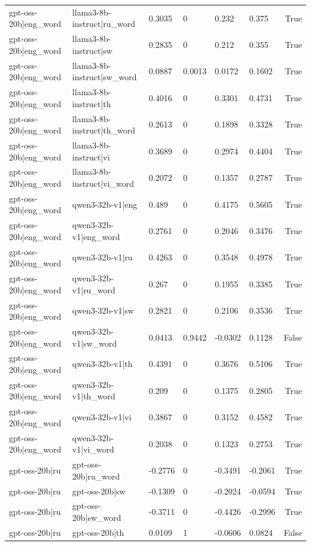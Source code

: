 \begin{table}
\begin{tabular}{llllllr}
gpt-oss-20b|eng_word & llama3-8b-instruct|ru_word & 0.3035 & 0 & 0.232 & 0.375 & True \\
gpt-oss-20b|eng_word & llama3-8b-instruct|sw & 0.2835 & 0 & 0.212 & 0.355 & True \\
gpt-oss-20b|eng_word & llama3-8b-instruct|sw_word & 0.0887 & 0.0013 & 0.0172 & 0.1602 & True \\
gpt-oss-20b|eng_word & llama3-8b-instruct|th & 0.4016 & 0 & 0.3301 & 0.4731 & True \\
gpt-oss-20b|eng_word & llama3-8b-instruct|th_word & 0.2613 & 0 & 0.1898 & 0.3328 & True \\
gpt-oss-20b|eng_word & llama3-8b-instruct|vi & 0.3689 & 0 & 0.2974 & 0.4404 & True \\
gpt-oss-20b|eng_word & llama3-8b-instruct|vi_word & 0.2072 & 0 & 0.1357 & 0.2787 & True \\
gpt-oss-20b|eng_word & qwen3-32b-v1|eng & 0.489 & 0 & 0.4175 & 0.5605 & True \\
gpt-oss-20b|eng_word & qwen3-32b-v1|eng_word & 0.2761 & 0 & 0.2046 & 0.3476 & True \\
gpt-oss-20b|eng_word & qwen3-32b-v1|ru & 0.4263 & 0 & 0.3548 & 0.4978 & True \\
gpt-oss-20b|eng_word & qwen3-32b-v1|ru_word & 0.267 & 0 & 0.1955 & 0.3385 & True \\
gpt-oss-20b|eng_word & qwen3-32b-v1|sw & 0.2821 & 0 & 0.2106 & 0.3536 & True \\
gpt-oss-20b|eng_word & qwen3-32b-v1|sw_word & 0.0413 & 0.9442 & -0.0302 & 0.1128 & False \\
gpt-oss-20b|eng_word & qwen3-32b-v1|th & 0.4391 & 0 & 0.3676 & 0.5106 & True \\
gpt-oss-20b|eng_word & qwen3-32b-v1|th_word & 0.209 & 0 & 0.1375 & 0.2805 & True \\
gpt-oss-20b|eng_word & qwen3-32b-v1|vi & 0.3867 & 0 & 0.3152 & 0.4582 & True \\
gpt-oss-20b|eng_word & qwen3-32b-v1|vi_word & 0.2038 & 0 & 0.1323 & 0.2753 & True \\
gpt-oss-20b|ru & gpt-oss-20b|ru_word & -0.2776 & 0 & -0.3491 & -0.2061 & True \\
gpt-oss-20b|ru & gpt-oss-20b|sw & -0.1309 & 0 & -0.2024 & -0.0594 & True \\
gpt-oss-20b|ru & gpt-oss-20b|sw_word & -0.3711 & 0 & -0.4426 & -0.2996 & True \\
gpt-oss-20b|ru & gpt-oss-20b|th & 0.0109 & 1 & -0.0606 & 0.0824 & False \\

\end{tabular}
\end{table}
